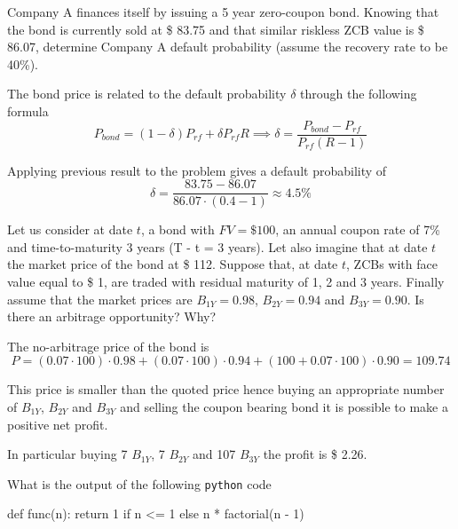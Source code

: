 \documentclass[12pt,a4paper]{exam}
\begin{document}
\begin{questions}
\question
Company A finances itself by issuing a 5 year zero-coupon bond. Knowing that the bond is currently sold at \$ 83.75 and that similar riskless ZCB value is \$ 86.07, determine Company A default probability (assume the recovery rate to be 40\%).
\fillwithlines{3cm}
\begin{solution}
The bond price is related to the default probability $\delta$ through the following formula
\begin{equation*}
  P_{bond} = (1-\delta)P_{rf} + \delta P_{rf} R \implies \delta = \frac{P_{bond}-P_{rf}}{P_{rf}(R-1)}
\end{equation*}

Applying previous result to the problem gives a default probability of
\begin{equation*}
  \delta = \frac{83.75-86.07}{86.07\cdot(0.4-1)} \approx 4.5\% 
\end{equation*}
\end{solution}

\question
Let us consider at date $t$, a bond with $FV = \$ 100$, an annual coupon rate of 7\% and time-to-maturity 3 years (T - t = 3 years).
Let also imagine that at date $t$ the market price of the bond at \$ 112.
Suppose that, at date $t$, ZCBs with face value equal to \$ 1, are traded with residual maturity of 1, 2 and 3 years.
Finally assume that the market prices are $B_{1Y} = 0.98$, $B_{2Y} = 0.94$ and $B_{3Y} = 0.90$.
Is there an arbitrage opportunity? Why?
\fillwithlines{3cm}
\begin{solution}
The no-arbitrage price of the bond is
\begin{equation*}
  P = (0.07\cdot100)\cdot 0.98 + (0.07\cdot100)\cdot 0.94 + (100 + 0.07\cdot100)\cdot 0.90 = 109.74
\end{equation*}

This price is smaller than the quoted price hence buying an appropriate number of $B_{1Y}$, $B_{2Y}$ and $B_{3Y}$ and selling the coupon bearing bond it is possible to make a positive net profit.

In particular buying 7 $B_{1Y}$, 7 $B_{2Y}$ and 107 $B_{3Y}$ the profit is \$ 2.26.
\end{solution}

\question
What is the output of the following \texttt{python} code

\begin{ipython}
def func(n):
    return 1 if n <= 1 else n * factorial(n - 1)


\end{ipython}
\end{questions}
\end{document}

